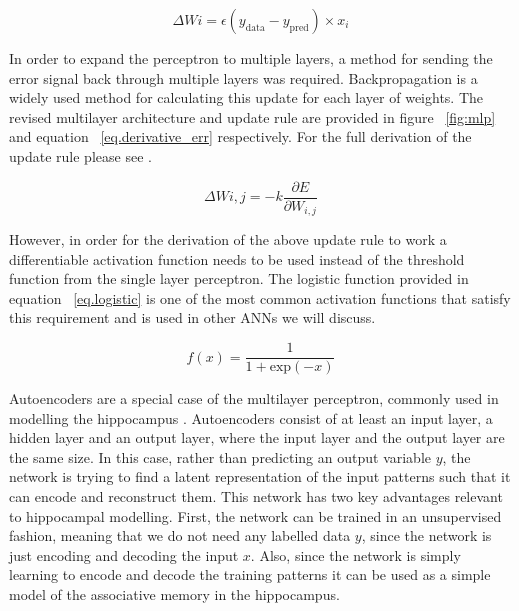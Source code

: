 \begin{equation}
\Delta W{i} = \epsilon(y_{\mathrm{data}} - y_{\mathrm{pred}}) \times x_{i} \label{eq.perceptron_update}
\end{equation}

In order to expand the perceptron to multiple layers, a method for sending the error signal back through 
multiple layers was required. 
Backpropagation \citep{backprop} is a widely used method for calculating this update 
for each layer of weights. 
The revised multilayer architecture and update rule are provided in figure 
~\ref{fig:mlp} and equation ~\ref{eq.derivative_err} respectively. 
For the full derivation of the update rule please see \citep{backprop}.

\begin{equation}
\Delta W{i,j} = -k\frac{\partial E}{\partial W_{i,j}} \label{eq.derivative_err}
\end{equation}

However, in order for the derivation of the above update rule to work a 
differentiable activation function needs to be used 
instead of the threshold function from the single layer perceptron. 
The logistic function provided in 
equation ~\ref{eq.logistic} is one of the most common activation functions that satisfy this 
requirement and is used in other \acp{ANN} we will discuss.

\begin{equation}
f(x) = \frac{1}{1 + \mathrm{exp}(-x)} \label{eq.logistic}
\end{equation}

Autoencoders are a special case of the multilayer perceptron, 
commonly used in modelling the hippocampus \citep{autoencoder-model, replacement_neurogenesis}.
Autoencoders consist of at least an input layer, a hidden layer and an output layer, 
where the input layer and the output layer are the same size.
In this case, rather than predicting an output variable $y$, 
the network is trying to find a latent representation of the input patterns such that it can encode and reconstruct them. 
This network has two key advantages relevant to hippocampal modelling. 
First, the network can be trained in an unsupervised 
fashion, meaning that we do not need any labelled data $y$, since the network is 
just encoding and decoding the input $x$.
Also, since the network is simply learning to encode and decode the training 
patterns it can be used as a simple model of 
the associative memory in the hippocampus.


